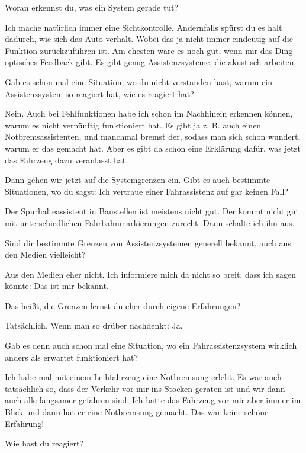 \interviewerin
Woran erkennst du, was ein System gerade tut?

Ich mache natürlich immer eine Sichtkontrolle. Andernfalls spürst du es
halt dadurch, wie sich das Auto verhält. Wobei das ja nicht immer
eindeutig auf die Funktion zurückzuführen ist. Am ehesten wäre es noch
gut, wenn mir das Ding optisches Feedback gibt. Es gibt genug
Assistenzsysteme, die akustisch arbeiten.

\interviewerin
Gab es schon mal eine Situation, wo du nicht verstanden hast, warum ein
Assistenzsystem so reagiert hat, wie es reagiert hat?

Nein. Auch bei Fehlfunktionen habe ich schon im Nachhinein erkennen
können, warum es nicht vernünftig funktioniert hat. Es gibt ja z. B.
auch einen Notbremsassistenten, und manchmal bremst der, sodass man sich
schon wundert, warum er das gemacht hat. Aber es gibt da schon eine
Erklärung dafür, was jetzt das Fahrzeug dazu veranlasst hat.

\interviewerin
Dann gehen wir jetzt auf die Systemgrenzen ein. Gibt es auch bestimmte
Situationen, wo du sagst: Ich vertraue einer Fahrassistenz auf gar
keinen Fall?

Der Spurhalteassistent in Baustellen ist meistens nicht gut. Der kommt
nicht gut mit unterschiedlichen Fahrbahnmarkierungen zurecht. Dann
schalte ich ihn aus.

\interviewerin
Sind dir bestimmte Grenzen von Assistenzsystemen generell bekannt, auch
aus den Medien vielleicht?

Aus den Medien eher nicht. Ich informiere mich da nicht so breit, dass
ich sagen könnte: Das ist mir bekannt.

\interviewerin
Das heißt, die Grenzen lernst du eher durch eigene Erfahrungen?

Tatsächlich. Wenn man so drüber nachdenkt: Ja.

\interviewerin
Gab es denn auch schon mal eine Situation, wo ein Fahrassistenzsystem
wirklich anders als erwartet funktioniert hat?

Ich habe mal mit einem Leihfahrzeug eine Notbremsung erlebt. Es war auch
tatsächlich so, dass der Verkehr vor mir ins Stocken geraten ist und wir
dann auch alle langsamer gefahren sind. Ich hatte das Fahrzeug vor mir
aber immer im Blick und dann hat er eine Notbremsung gemacht. Das war
keine schöne Erfahrung!

\interviewerin
Wie hast du reagiert?

